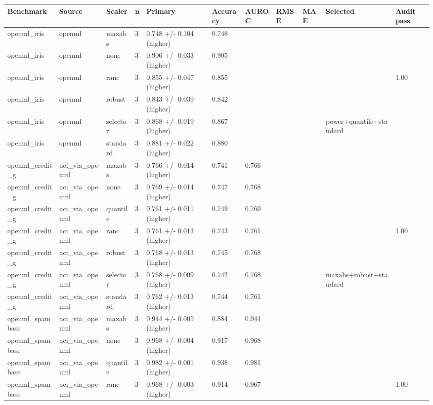 \begin{tabular}{lllllllllll}
\toprule
Benchmark & Source & Scaler & n & Primary & Accuracy & AUROC & RMSE & MAE & Selected & Audit pass \\
\midrule
openml\_iris & openml & maxabs & 3 & 0.748 +/- 0.104 (higher) & 0.748 &  &  &  &  &  \\
openml\_iris & openml & none & 3 & 0.906 +/- 0.033 (higher) & 0.905 &  &  &  &  &  \\
openml\_iris & openml & ranc & 3 & 0.855 +/- 0.047 (higher) & 0.855 &  &  &  &  & 1.00 \\
openml\_iris & openml & robust & 3 & 0.843 +/- 0.039 (higher) & 0.842 &  &  &  &  &  \\
openml\_iris & openml & selector & 3 & 0.868 +/- 0.019 (higher) & 0.867 &  &  &  & power+quantile+standard &  \\
openml\_iris & openml & standard & 3 & 0.881 +/- 0.022 (higher) & 0.880 &  &  &  &  &  \\
openml\_credit\_g & uci\_via\_openml & maxabs & 3 & 0.766 +/- 0.014 (higher) & 0.741 & 0.766 &  &  &  &  \\
openml\_credit\_g & uci\_via\_openml & none & 3 & 0.769 +/- 0.014 (higher) & 0.747 & 0.768 &  &  &  &  \\
openml\_credit\_g & uci\_via\_openml & quantile & 3 & 0.761 +/- 0.011 (higher) & 0.749 & 0.760 &  &  &  &  \\
openml\_credit\_g & uci\_via\_openml & ranc & 3 & 0.761 +/- 0.013 (higher) & 0.743 & 0.761 &  &  &  & 1.00 \\
openml\_credit\_g & uci\_via\_openml & robust & 3 & 0.768 +/- 0.013 (higher) & 0.745 & 0.768 &  &  &  &  \\
openml\_credit\_g & uci\_via\_openml & selector & 3 & 0.768 +/- 0.009 (higher) & 0.742 & 0.768 &  &  & maxabs+robust+standard &  \\
openml\_credit\_g & uci\_via\_openml & standard & 3 & 0.762 +/- 0.013 (higher) & 0.744 & 0.761 &  &  &  &  \\
openml\_spambase & uci\_via\_openml & maxabs & 3 & 0.944 +/- 0.005 (higher) & 0.884 & 0.944 &  &  &  &  \\
openml\_spambase & uci\_via\_openml & none & 3 & 0.968 +/- 0.004 (higher) & 0.917 & 0.968 &  &  &  &  \\
openml\_spambase & uci\_via\_openml & quantile & 3 & 0.982 +/- 0.001 (higher) & 0.938 & 0.981 &  &  &  &  \\
openml\_spambase & uci\_via\_openml & ranc & 3 & 0.968 +/- 0.003 (higher) & 0.914 & 0.967 &  &  &  & 1.00 \\

\end{tabular}
